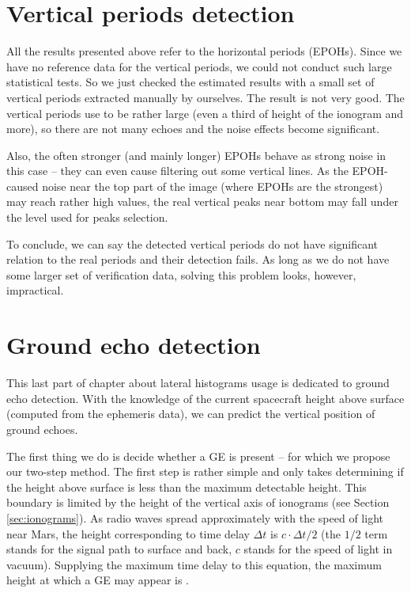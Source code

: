 \section{Vertical periods detection}
All the results presented above refer to the horizontal periods (EPOHs). Since we have no reference data for the vertical periods, we could not conduct such large statistical tests. So we just checked the estimated results with a small set of vertical periods extracted manually by ourselves. The result is not very good. The vertical periods use to be rather large (even a third of height of the ionogram and more), so there are not many echoes and the noise effects become significant. 

Also, the often stronger (and mainly longer) EPOHs behave as strong noise in this case -- they can even cause filtering out some vertical lines. As the EPOH-caused noise near the top part of the image (where EPOHs are the strongest) may reach rather high values, the real vertical peaks near bottom may fall under the  level used for peaks selection.

To conclude, we can say the detected vertical periods do not have significant relation to the real periods and their detection fails. As long as we do not have some larger set of verification data, solving this problem looks, however, impractical. 

\section{Ground echo detection}
\label{sec:ge_detection}
This last part of chapter about lateral histograms usage is dedicated to ground echo detection. With the knowledge of the current spacecraft height above surface (computed from the ephemeris data), we can predict the vertical position of ground echoes.

The first thing we do is decide whether a GE is present -- for which we propose our two-step method. The first step is rather simple and only takes determining if the height above surface is less than the maximum detectable height. This boundary is limited by the  height of the vertical axis of ionograms (see Section \ref{sec:ionograms}). As radio waves spread approximately with the speed of light near Mars, the height corresponding to time delay $\Delta t$ is $c \cdot \Delta t / 2$ (the $1/2$ term stands for the signal path to surface and back, $c$ stands for the speed of light in vacuum). Supplying the maximum time delay to this equation, the maximum height at which a GE may appear is .

